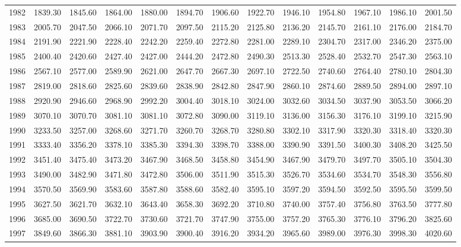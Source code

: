 \begin{longtable}{rrrrrrrrrrrrr}
  1982 & 1839.30 & 1845.60 & 1864.00 & 1880.00 & 1894.70 & 1906.60 & 1922.70 & 1946.10 & 1954.80 & 1967.10 & 1986.10 & 2001.50 \\ 
  1983 & 2005.70 & 2047.50 & 2066.10 & 2071.70 & 2097.50 & 2115.20 & 2125.80 & 2136.20 & 2145.70 & 2161.10 & 2176.00 & 2184.70 \\ 
  1984 & 2191.90 & 2221.90 & 2228.40 & 2242.20 & 2259.40 & 2272.80 & 2281.00 & 2289.10 & 2304.70 & 2317.00 & 2346.20 & 2375.00 \\ 
  1985 & 2400.40 & 2420.60 & 2427.40 & 2427.00 & 2444.20 & 2472.80 & 2490.30 & 2513.30 & 2528.40 & 2532.70 & 2547.30 & 2563.10 \\ 
  1986 & 2567.10 & 2577.00 & 2589.90 & 2621.00 & 2647.70 & 2667.30 & 2697.10 & 2722.50 & 2740.60 & 2764.40 & 2780.10 & 2804.30 \\ 
  1987 & 2819.00 & 2818.60 & 2825.60 & 2839.60 & 2838.90 & 2842.80 & 2847.90 & 2860.10 & 2874.60 & 2889.50 & 2894.00 & 2897.10 \\ 
  1988 & 2920.90 & 2946.60 & 2968.90 & 2992.20 & 3004.40 & 3018.10 & 3024.00 & 3032.60 & 3034.50 & 3037.90 & 3053.50 & 3066.20 \\ 
  1989 & 3070.10 & 3070.70 & 3081.10 & 3081.10 & 3072.80 & 3090.00 & 3119.10 & 3136.00 & 3156.30 & 3176.10 & 3199.10 & 3215.90 \\ 
  1990 & 3233.50 & 3257.00 & 3268.60 & 3271.70 & 3260.70 & 3268.70 & 3280.80 & 3302.10 & 3317.90 & 3320.30 & 3318.40 & 3320.30 \\ 
  1991 & 3333.40 & 3356.20 & 3378.10 & 3385.30 & 3394.30 & 3398.70 & 3388.00 & 3390.90 & 3391.50 & 3400.30 & 3408.20 & 3425.50 \\ 
  1992 & 3451.40 & 3475.40 & 3473.20 & 3467.90 & 3468.50 & 3458.80 & 3454.90 & 3467.90 & 3479.70 & 3497.70 & 3505.10 & 3504.30 \\ 
  1993 & 3490.00 & 3482.90 & 3471.80 & 3472.80 & 3506.00 & 3511.90 & 3515.30 & 3526.70 & 3534.60 & 3534.70 & 3548.30 & 3556.80 \\ 
  1994 & 3570.50 & 3569.90 & 3583.60 & 3587.80 & 3588.60 & 3582.40 & 3595.10 & 3597.20 & 3594.50 & 3592.50 & 3595.50 & 3599.50 \\ 
  1995 & 3627.50 & 3621.70 & 3632.10 & 3643.40 & 3658.30 & 3692.20 & 3710.80 & 3740.00 & 3757.40 & 3756.80 & 3763.50 & 3777.80 \\ 
  1996 & 3685.00 & 3690.50 & 3722.70 & 3730.60 & 3721.70 & 3747.90 & 3755.00 & 3757.20 & 3765.30 & 3776.10 & 3796.20 & 3825.60 \\ 
  1997 & 3849.60 & 3866.30 & 3881.10 & 3903.90 & 3900.40 & 3916.20 & 3934.20 & 3965.60 & 3989.00 & 3976.30 & 3998.30 & 4020.60 \\ 

\end{longtable}
